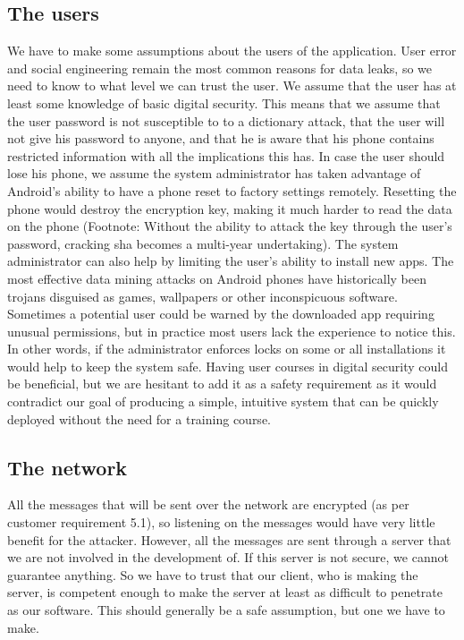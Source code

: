 \subsection{The users}
We have to make some assumptions about the users of the application. User error and social engineering remain the most common reasons for data leaks, so we need to know to what level we can trust the user.
\newline
\newline
We assume that the user has at least some knowledge of basic digital security. This means that we assume that the user password is not susceptible to to a dictionary attack, that the user will not give his password to anyone, and that he is aware that his phone contains restricted information with all the implications this has. 
\newline
\newline
In case the user should lose his phone, we assume the system administrator has taken advantage of Android’s ability to have a phone reset to factory settings remotely. Resetting the phone would destroy the encryption key, making it much harder to read the data on the phone (Footnote: Without the ability to attack the key through the user’s password, cracking \gls{sha} becomes a multi-year undertaking).
\newline
\newline
The system administrator can also help by limiting the user’s ability to install new apps. The most effective data mining attacks on Android phones have historically been trojans disguised as games, wallpapers or other inconspicuous software. Sometimes a potential user could be warned by the downloaded app requiring unusual permissions, but in practice most users lack the experience to notice this. In other words, if the administrator enforces locks on some or all installations it would help to keep the system safe.
\newline
\newline
Having user courses in digital security could be beneficial, but we are hesitant to add it as a safety requirement as it would contradict our goal of producing a simple, intuitive system that can be quickly deployed without the need for a training course. 

\subsection{The network}
All the messages that will be sent over the network are encrypted (as per customer requirement 5.1), so listening on the messages would have very little benefit for the attacker. However, all the messages are sent through a server that we are not involved in the development of. If this server is not secure, we cannot guarantee anything. So we have to trust that our client, who is making the server, is competent enough to make the server at least as difficult to penetrate as our software. This should generally be a safe assumption, but one we have to make.